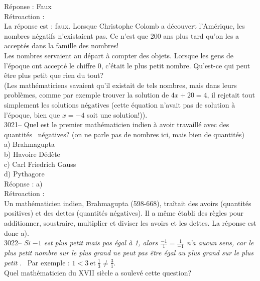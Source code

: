 \documentclass[letterpaper, 12pt]{article}
\begin{document}
R\'eponse : Faux\\

R\'etroaction :\\
La r\'eponse est : faux. Lorsque Christophe Colomb a d\'ecouvert l'Am\'erique, les nombres n\'egatifs n'existaient pas. Ce n'est que 200 ans plus tard qu'on les a accept\'es dans la famille des nombres!\\
Les nombres servaient au d\'epart \`a compter des objets. Lorsque les gens de l'\'epoque ont accept\'e le chiffre 0, c'\'etait le plus petit nombre. Qu'est-ce qui peut \^etre plus petit que rien du tout?\\ (Les math\'ematiciens savaient qu'il existait de tels nombres, mais dans leurs probl\`emes, comme par exemple trouver la solution de $4x + 20 = 4$, il rejetait tout simplement les solutions n\'egatives (cette \'equation n'avait pas de solution \`a l'\'epoque, bien que $x = -4$ soit une solution!)).\\



3021-- Quel est le premier math\'ematicien indien \`a avoir travaill\'e avec des \og quantit\'es \fg \ n\'egatives? (on ne parle pas de nombres ici, mais bien de quantit\'es)\\

a) Brahmagupta\\
b) Havoire D\'ed\`ete\\
c) Carl Friedrich Gauss\\
d) Pythagore\\

R\'eopnse : a)\\

R\'etroaction :\\
Un math\'ematicien indien, Brahmagupta {\small(598-668)}, tra\^itait des avoirs (quantit\'es positives) et des dettes (quantit\'es n\'egatives). Il a m\^eme \'etabli des r\`egles pour additionner, soustraire, multiplier et diviser les avoirs et les dettes. La r\'eponse est donc a).\\



3022-- \og \emph{Si $-1$ est plus petit mais pas \'egal \`a 1, alors $\frac{-1}{1} = \frac{1}{-1}$ n'a aucun sens, car le plus petit nombre sur le plus grand ne peut pas \^etre \'egal au plus grand sur le plus petit} \fg. \ Par exemple : $1 < 3 \ \textrm{et} \ \frac{1}{3} \neq \frac{3}{1}$.\\[2mm]
Quel math\'ematicien du {\scriptsize XVII\ieme{}} si\`ecle a soulev\'e cette question?\\
\end{document}

